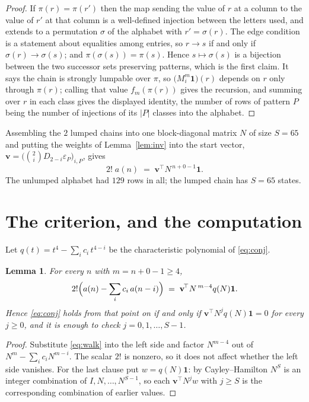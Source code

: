 \documentclass[11pt,a4paper]{article}
\theoremstyle{plain}
\newtheorem{lemma}[theorem]{Lemma}
\theoremstyle{definition}
\begin{document}
\begin{proof}
If $\pi(r)=\pi(r')$ then the map sending the value of $r$ at a column to the value of $r'$
at that column is a well-defined injection between the letters used, and extends to a
permutation $\sigma$ of the alphabet with $r'=\sigma(r)$. The edge condition is a statement
about equalities among entries, so $r\to s$ if and only if $\sigma(r)\to\sigma(s)$; and
$\pi(\sigma(s))=\pi(s)$. Hence $s\mapsto\sigma(s)$ is a bijection between the two successor
sets preserving patterns, which is the first claim. It says the chain is strongly lumpable
over $\pi$, so $\bigl(M_i^{m}\mathbf{1}\bigr)(r)$ depends on $r$ only through $\pi(r)$;
calling that value $f_m(\pi(r))$ gives the recursion, and summing over $r$ in each class
gives the displayed identity, the number of rows of pattern $P$ being the number of
injections of its $|P|$ classes into the alphabet.
\end{proof}

Assembling the $2$ lumped chains into one block-diagonal matrix $N$ of size $S=65$ and
putting the weights of Lemma~\ref{lem:inv} into the start vector,
$\mathbf{v}=\bigl(\binom{2}{i}D_{2-i}\varepsilon_P\bigr)_{i,P}$, gives
\begin{equation}\label{eq:walk}
2!\;a(n)\;=\;\mathbf{v}^{\!\top}N^{\,n+0-1}\mathbf{1} .
\end{equation}
The unlumped alphabet had $129$ rows in all; the lumped chain has $S=65$ states.

\section{The criterion, and the computation}

Let $q(t)=t^{4}-\sum_i c_i\,t^{4-i}$ be the characteristic polynomial of
\eqref{eq:conj}.

\begin{lemma}\label{lem:crit}
For every $n$ with $m=n+0-1\ge4$,
\[
2!\Bigl(a(n)-\sum_i c_i\,a(n-i)\Bigr)\;=\;\mathbf{v}^{\!\top}N^{\,m-4}q(N)\mathbf{1} .
\]
Hence \eqref{eq:conj} holds from that point on if and only if
$\mathbf{v}^{\!\top}N^{j}q(N)\mathbf{1}=0$ for every $j\ge0$, and it is enough to check
$j=0,1,\dots,S-1$.
\end{lemma}

\begin{proof}
Substitute \eqref{eq:walk} into the left side and factor $N^{m-4}$ out of
$N^{m}-\sum_i c_iN^{m-i}$. The scalar $2!$ is nonzero, so it does not affect whether
the left side vanishes. For the last clause put $w=q(N)\mathbf{1}$: by Cayley--Hamilton
$N^{S}$ is an integer combination of $I,N,\dots,N^{S-1}$, so each
$\mathbf{v}^{\!\top}N^{j}w$ with $j\ge S$ is the corresponding combination of earlier
values.
\end{proof}
\end{document}
